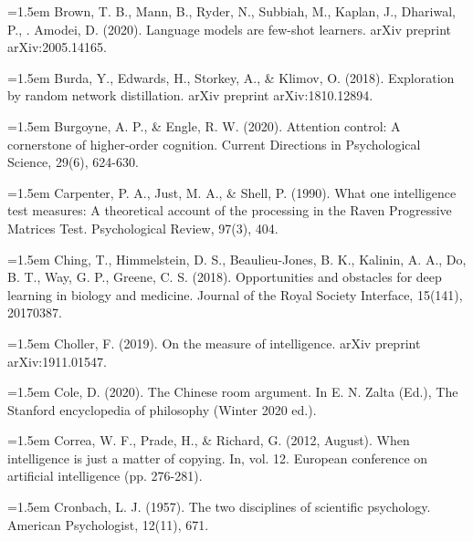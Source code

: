 \hangindent=1.5em
Brown, T. B., Mann, B., Ryder, N., Subbiah, M., Kaplan, J.,
Dhariwal, P., . Amodei, D. (2020).
Language models are few-shot learners.
arXiv preprint arXiv:2005.14165.
\par

\hangindent=1.5em
Burda, Y., Edwards, H., Storkey, A., \& Klimov, O. (2018).
Exploration by random network distillation.
arXiv preprint arXiv:1810.12894.
\par

\hangindent=1.5em
Burgoyne, A. P., \& Engle, R. W. (2020).
Attention control: A cornerstone of higher-order cognition.
Current Directions in Psychological Science, 29(6), 624-630.
\par

\hangindent=1.5em
Carpenter, P. A., Just, M. A., \& Shell, P. (1990).
What one intelligence test measures: A theoretical account of the
processing in the Raven Progressive Matrices Test.
Psychological Review, 97(3), 404.
\par

\hangindent=1.5em
Ching, T., Himmelstein, D. S., Beaulieu-Jones, B. K.,
Kalinin, A. A., Do, B. T., Way, G. P., Greene, C. S. (2018).
Opportunities and obstacles for deep learning in biology and medicine.
Journal of the Royal Society Interface, 15(141), 20170387.
\par

\hangindent=1.5em
Choller, F. (2019).
On the measure of intelligence.
arXiv preprint arXiv:1911.01547.
\par

\hangindent=1.5em
Cole, D. (2020).
The Chinese room argument.
In E. N. Zalta (Ed.),
The Stanford encyclopedia of philosophy (Winter 2020 ed.).
\par

\hangindent=1.5em
Correa, W. F., Prade, H., \& Richard, G. (2012, August).
When intelligence is just a matter of copying.
In, vol. 12.
European conference on artificial intelligence (pp. 276-281).
\par

\hangindent=1.5em
Cronbach, L. J. (1957).
The two disciplines of scientific psychology.
American Psychologist, 12(11), 671.
\par

